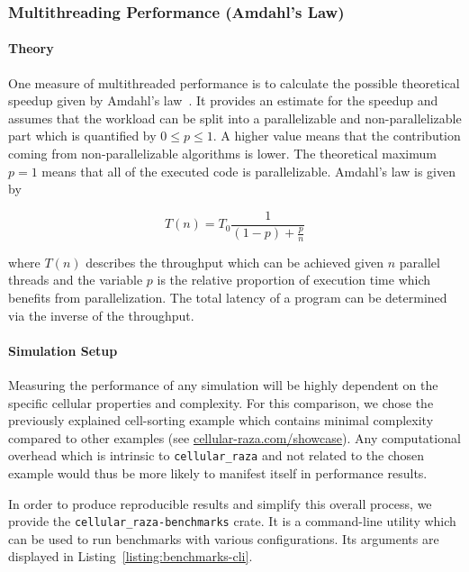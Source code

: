 \subsubsection{Multithreading Performance (Amdahl's Law)}

\paragraph{Theory}
One measure of multithreaded performance is to calculate the possible theoretical speedup
given by Amdahl's law~\cite{Rodgers1985}.
It provides an estimate for the speedup and assumes that the workload can be split into a
parallelizable and non-parallelizable part which is quantified by $0\leq p \leq1$.
A higher value means that the contribution coming from non-parallelizable algorithms is lower.
The theoretical maximum $p=1$ means that all of the executed code is parallelizable.
Amdahl's law is given by

\begin{equation}
    T(n) = T_0\frac{1}{(1-p) + \frac{p}{n}}
    \label{eq:amdahls-law}
\end{equation}

where $T(n)$ describes the throughput which can be achieved given $n$ parallel threads and the
variable $p$ is the relative proportion of execution time which benefits from parallelization.
The total latency of a program can be determined via the inverse of the throughput.

\paragraph{Simulation Setup}
Measuring the performance of any simulation will be highly dependent on the specific cellular 
properties and complexity.
For this comparison, we chose the previously explained cell-sorting example which contains minimal
complexity compared to other examples (see
\href{https://cellular-raza.com/showcase}{cellular-raza.com/showcase}).
Any computational overhead which is intrinsic to \texttt{cellular\_raza} and not related to the
chosen example would thus be more likely to manifest itself in performance results.

In order to produce reproducible results and simplify this overall process, we provide the
\texttt{cellular\_raza-benchmarks} crate.
It is a command-line utility which can be used to run benchmarks with various configurations.
Its arguments are displayed in Listing~\ref{listing:benchmarks-cli}.

